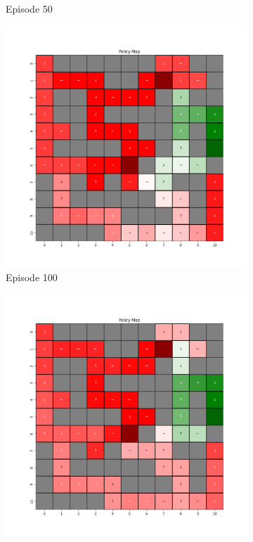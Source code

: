 \documentclass{assignment}
\begin{document}
\begin{figure}[H]
\begin{subfigure}{0.3\textwidth}
    \caption{Episode 50}
    \end{subfigure}\hfill
    \begin{subfigure}{0.3\textwidth}
        \includegraphics[width=\textwidth]{figures/policy_q/alpha_sweep/policy_alpha_1_gamma_0.95_epsilon_0.2_iteration_100.png}
    \caption{Episode 100}
    \end{subfigure}
    \begin{subfigure}{0.3\textwidth}
        \includegraphics[width=\textwidth]{figures/policy_q/alpha_sweep/policy_alpha_1_gamma_0.95_epsilon_0.2_iteration_1000.png}

\end{subfigure}
\end{figure}
\end{document}
